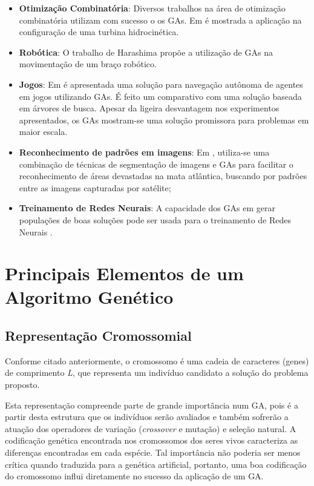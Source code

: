 \begin{itemize}
\item \textbf{Otimização Combinatória}: Diversos trabalhos na área de otimização combinatória utilizam com sucesso o os GAs. Em \cite{Anna} é mostrada a aplicação na configuração de uma turbina hidrocinética.

\item \textbf{Robótica}: O trabalho de Harashima \cite{Harashima} propõe a utilização de GAs na movimentação de um braço robótico.

\item \textbf{Jogos}: Em \cite{Appolinario} é apresentada uma solução para navegação autônoma de agentes em jogos utilizando GAs. É feito um comparativo com uma solução baseada em árvores de busca. Apesar da ligeira desvantagem nos experimentos apresentados, os GAs mostram-se uma solução promissora para problemas em maior escala.

\item \textbf{Reconhecimento de padrões em imagens}: Em \cite{Marinho}, utiliza-se uma combinação de técnicas de segmentação de imagens e GAs para facilitar o reconhecimento de áreas devastadas na mata atlântica, buscando por padrões entre as imagens capturadas por satélite;

\item \textbf{Treinamento de Redes Neurais}: A capacidade dos GAs em gerar populações de boas soluções pode ser usada para o treinamento de Redes Neurais \cite{VanRooij1996}.

\end{itemize} 

\section{Principais Elementos de um Algoritmo Genético}
	
	\subsection{Representação Cromossomial}

	Conforme citado anteriormente, o cromossomo é uma cadeia de caracteres (genes) de comprimento \textit{L}, que representa um indivíduo candidato a solução do problema proposto.
	
	Esta representação compreende parte de grande importância num GA, pois é a partir desta estrutura que os indivíduos serão avaliados e também sofrerão a atuação dos operadores de variação (\textit{crossover} e mutação) e seleção natural. A codificação genética encontrada nos cromossomos dos seres vivos caracteriza as diferenças encontradas em cada espécie. Tal importância não poderia ser menos crítica quando traduzida para a genética artificial, portanto, uma boa codificação do cromossomo influi diretamente no sucesso da aplicação de um GA.
	
